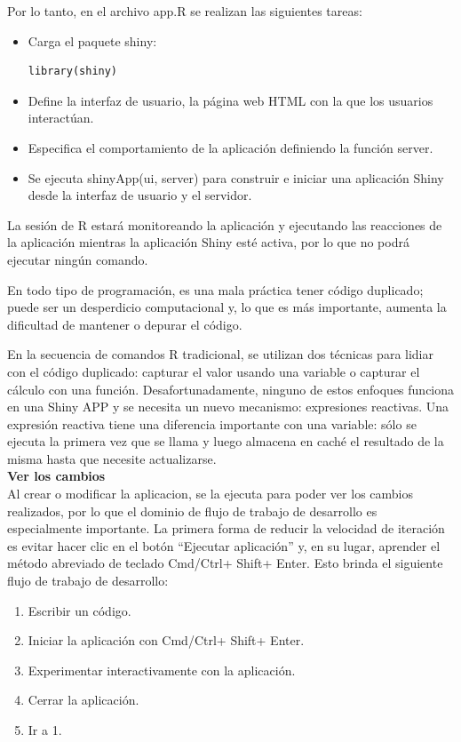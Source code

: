 Por lo tanto, en el archivo app.R se realizan las siguientes tareas:

\begin{itemize}
\item Carga el paquete shiny: 
\begin{lstlisting} 
library(shiny) 
\end{lstlisting}
\item Define la interfaz de usuario, la página web HTML con la que los usuarios interactúan.
\item Especifica el comportamiento de la aplicación definiendo la función server. 
\item Se ejecuta shinyApp(ui, server) para construir e iniciar una aplicación Shiny desde la interfaz de usuario y el servidor.
\end{itemize}


La sesión de R estará monitoreando la aplicación y ejecutando las reacciones de la aplicación mientras la aplicación Shiny esté activa, por lo que no podrá ejecutar ningún comando.

En todo tipo de programación, es una mala práctica tener código duplicado; puede ser un desperdicio computacional y, lo que es más importante, aumenta la dificultad de mantener o depurar el código.

En la secuencia de comandos R tradicional, se utilizan dos técnicas para lidiar con el código duplicado: capturar el valor usando una variable o capturar el cálculo con una función. Desafortunadamente, ninguno de estos enfoques funciona en una Shiny APP y se necesita un nuevo mecanismo: expresiones reactivas. Una expresión reactiva tiene una diferencia importante con una variable: sólo se ejecuta la primera vez que se llama y luego almacena en caché el resultado de la misma hasta que necesite actualizarse.\\


\textbf{Ver los cambios}\\


Al crear o modificar la aplicacion, se la ejecuta para poder ver los cambios realizados, por lo que el dominio de flujo de trabajo de desarrollo es especialmente importante. La primera forma de reducir la velocidad de iteración es evitar hacer clic en el botón ``Ejecutar aplicación'' y, en su lugar, aprender el método abreviado de teclado Cmd/Ctrl+ Shift+ Enter. Esto brinda el siguiente flujo de trabajo de desarrollo:

\begin{enumerate}
\item Escribir un código.
\item Iniciar la aplicación con Cmd/Ctrl+ Shift+ Enter.
\item Experimentar interactivamente con la aplicación.
\item Cerrar la aplicación.
\item Ir a 1.
\end{enumerate}


